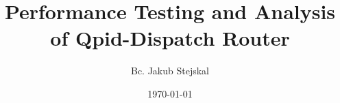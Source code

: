 \documentclass[hyperref={pdfpagelabels=false, unicode},pdf,slideColor,fyma,9pt]{beamer}
\title{Performance Testing and Analysis of Qpid-Dispatch Router}
\author[Bc. Jakub Stejskal]{Bc. Jakub Stejskal}
\institute[]{Faculty of Information Technology}
\date[]{\today}
\begin{document}
		\begin{frame}
				\titlepage
        \begin{figure}[ht]
        	\begin{center}
        	\end{center}
        \end{figure}
		\end{frame}

\end{document}
